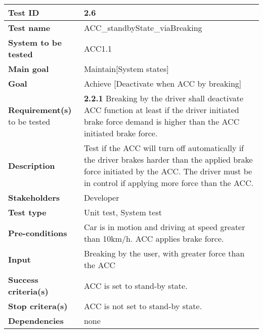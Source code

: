 	\begin{table}[H]
		\begin{tabular}{| p{4cm} | p{10cm} |}
			\hline
			\rowcolor{gray}
			{\bf Test ID} & 2.6 \\ \hline
			{\bf Test name} & ACC\_standbyState\_viaBreaking \\ \hline
			{\bf System to be tested} & ACC1.1\\ \hline
			{\bf Main goal} & Maintain[System states] \\ \hline
			{\bf Goal} & Achieve [Deactivate when ACC by breaking] \\ \hline
			{\bf Requirement(s)} to be tested & {\bf 2.2.1} Breaking by the driver shall 
			deactivate ACC function at least if the driver initiated brake force demand 
			is higher than the ACC initiated brake force.\\ \hline
			{\bf Description} & Test if the ACC will turn off automatically if the driver 
			brakes harder than the applied brake force initiated by the ACC. The driver 
			must be in control if applying more force than the ACC. \\ \hline
			{\bf Stakeholders} & Developer\\ \hline
			{\bf Test type} & Unit test, System test \\ \hline
			{\bf Pre-conditions} & Car is in motion and driving at speed greater than 10km/h.
			ACC applies brake force.\\ \hline
			{\bf Input} & Breaking by the user, with greater force than the ACC \\ \hline
			{\bf Success criteria(s)} & ACC is set to stand-by state.\\ \hline
			{\bf Stop critera(s)} & ACC is not set to stand-by state.\\ \hline
			{\bf Dependencies} & none \\ \hline
		\end{tabular}
	\end{table}

